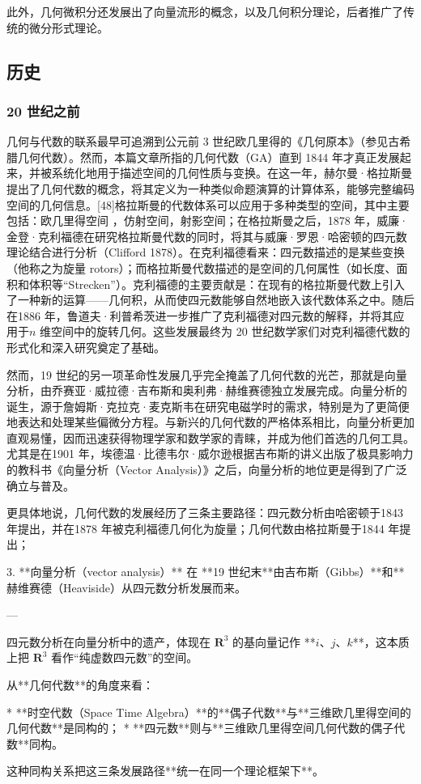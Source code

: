 此外，几何微积分还发展出了向量流形的概念，以及几何积分理论，后者推广了传统的微分形式理论。
\subsection{历史}
\subsubsection{20 世纪之前}
几何与代数的联系最早可追溯到公元前 3 世纪欧几里得的《几何原本》（参见古希腊几何代数）。然而，本篇文章所指的几何代数（GA）直到 1844 年才真正发展起来，并被系统化地用于描述空间的几何性质与变换。在这一年，赫尔曼·格拉斯曼提出了几何代数的概念，将其定义为一种类似命题演算的计算体系，能够完整编码空间的几何信息。[48]格拉斯曼的代数体系可以应用于多种类型的空间，其中主要包括：欧几里得空间
，仿射空间，射影空间；在格拉斯曼之后，1878 年，威廉·金登·克利福德在研究格拉斯曼代数的同时，将其与威廉·罗恩·哈密顿的四元数理论结合进行分析（Clifford 1878）。在克利福德看来：四元数描述的是某些变换（他称之为旋量 rotors）；而格拉斯曼代数描述的是空间的几何属性（如长度、面积和体积等“Strecken”）。克利福德的主要贡献是：在现有的格拉斯曼代数上引入了一种新的运算——几何积，从而使四元数能够自然地嵌入该代数体系之中。随后在1886 年，鲁道夫·利普希茨进一步推广了克利福德对四元数的解释，并将其应用于$n$ 维空间中的旋转几何。这些发展最终为 20 世纪数学家们对克利福德代数的形式化和深入研究奠定了基础。

然而，19 世纪的另一项革命性发展几乎完全掩盖了几何代数的光芒，那就是向量分析，由乔赛亚·威拉德·吉布斯和奥利弗·赫维赛德独立发展完成。向量分析的诞生，源于詹姆斯·克拉克·麦克斯韦在研究电磁学时的需求，特别是为了更简便地表达和处理某些偏微分方程。与新兴的几何代数的严格体系相比，向量分析更加直观易懂，因而迅速获得物理学家和数学家的青睐，并成为他们首选的几何工具。尤其是在1901 年，埃德温·比德韦尔·威尔逊根据吉布斯的讲义出版了极具影响力的教科书《向量分析（Vector Analysis）》之后，向量分析的地位更是得到了广泛确立与普及。

更具体地说，几何代数的发展经历了三条主要路径：四元数分析由哈密顿于1843 年提出，并在1878 年被克利福德几何化为旋量；几何代数由格拉斯曼于1844 年提出；

3. **向量分析（vector analysis）**
   在 **19 世纪末**由\*\*吉布斯（Gibbs）**和**赫维赛德（Heaviside）\*\*从四元数分析发展而来。

---

四元数分析在向量分析中的遗产，体现在 $\mathbf{R}^3$ 的基向量记作 **$i$、$j$、$k$**，这本质上把 $\mathbf{R}^3$ 看作“纯虚数四元数”的空间。

从**几何代数**的角度来看：

* **时空代数（Space Time Algebra）**的**偶子代数**与**三维欧几里得空间的几何代数**是同构的；
* **四元数**则与**三维欧几里得空间几何代数的偶子代数**同构。

这种同构关系把这三条发展路径**统一在同一个理论框架下**。
